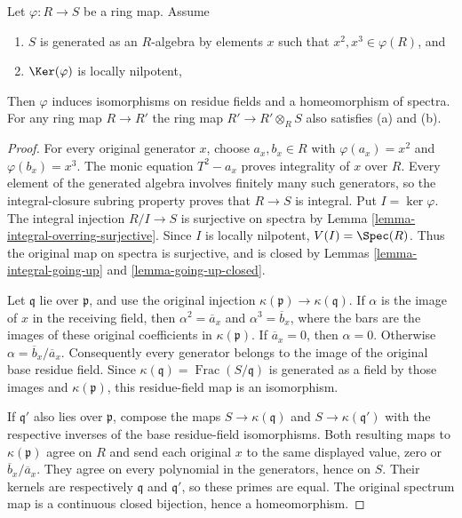 \begin{lemma}
\label{lemma-2-3-ring-map}
Let $\varphi : R \to S$ be a ring map. Assume
\begin{enumerate}
\item[(a)] $S$ is generated as an $R$-algebra by elements $x$ such
that $x^2, x^3 \in \varphi(R)$, and
\item[(b)] $\Ker(\varphi)$ is locally nilpotent,
\end{enumerate}
Then $\varphi$ induces isomorphisms on residue fields and
a homeomorphism of spectra. For any ring map $R \to R'$
the ring map $R' \to R' \otimes_R S$ also satisfies (a) and (b).
\end{lemma}

\begin{proof}
For every original generator $x$, choose $a_x,b_x\in R$
with $\varphi(a_x)=x^2$ and $\varphi(b_x)=x^3$.
The monic equation $T^2-a_x$ proves integrality of
$x$ over $R$. Every element of the generated algebra
involves finitely many such generators, so the
integral-closure subring property proves that
$R\to S$ is integral. Put $I=\ker\varphi$.
The integral injection $R/I\to S$ is surjective
on spectra by Lemma \ref{lemma-integral-overring-surjective}.
Since $I$ is locally nilpotent, $V(I)=\Spec(R)$.
Thus the original map on spectra is surjective,
and is closed by Lemmas \ref{lemma-integral-going-up}
and \ref{lemma-going-up-closed}.

Let $\mathfrak q$ lie over $\mathfrak p$, and use
the original injection
$\kappa(\mathfrak p)\to\kappa(\mathfrak q)$.
If $\alpha$ is the image of $x$ in the receiving
field, then $\alpha^2=\overline a_x$ and
$\alpha^3=\overline b_x$, where the bars are the
images of these original coefficients in
$\kappa(\mathfrak p)$. If $\overline a_x=0$,
then $\alpha=0$. Otherwise
$\alpha=\overline b_x/\overline a_x$.
Consequently every generator belongs to the
image of the original base residue field.
Since $\kappa(\mathfrak q)=\operatorname{Frac}(S/\mathfrak q)$
is generated as a field by those images and
$\kappa(\mathfrak p)$, this residue-field map
is an isomorphism.

If $\mathfrak q'$ also lies over $\mathfrak p$,
compose the maps $S\to\kappa(\mathfrak q)$ and
$S\to\kappa(\mathfrak q')$ with the respective
inverses of the base residue-field isomorphisms.
Both resulting maps to $\kappa(\mathfrak p)$
agree on $R$ and send each original $x$ to
the same displayed value, zero or
$\overline b_x/\overline a_x$.
They agree on every polynomial in the
generators, hence on $S$. Their kernels
are respectively $\mathfrak q$ and
$\mathfrak q'$, so these primes are equal.
The original spectrum map is a continuous
closed bijection, hence a homeomorphism.


\end{proof}
